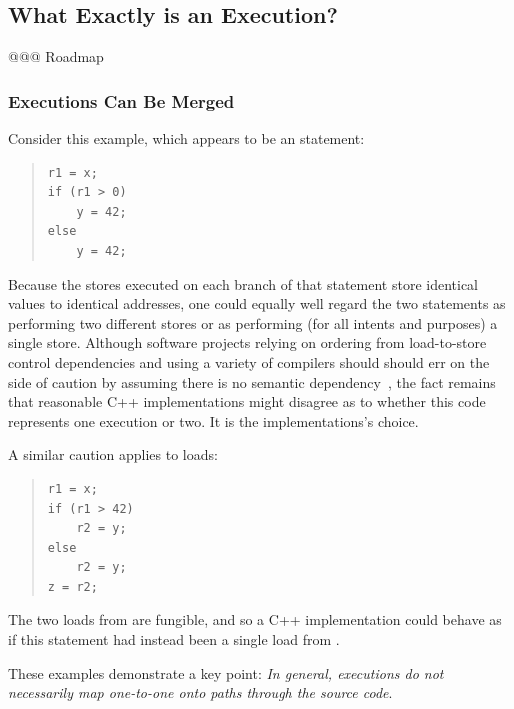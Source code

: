 \documentclass[10]{article}
\begin{document}
\subsection{What Exactly is an Execution?}
\label{sec:What Exactly is an Execution?}

@@@ Roadmap

\subsubsection{Executions Can Be Merged}
\label{sec:Executions Can Be Merged}

Consider this example, which appears to be an  statement:

\begin{quote}
\begin{verbatim}
r1 = x;
if (r1 > 0)
    y = 42;
else
    y = 42;
\end{verbatim}
\end{quote}

Because the stores executed on each branch of that  statement store
identical values to identical addresses, one could equally well regard
the two statements as performing two different stores or as performing
(for all intents and purposes) a single store.
Although software projects relying on ordering from load-to-store control
dependencies and using a variety of compilers should should err on the
side of caution by assuming there is no semantic
dependency~\cite{Howells2009membartxt},
the fact remains that reasonable C++ implementations might disagree as
to whether this code represents one execution or two.
It is the implementations's choice.

A similar caution applies to loads:

\begin{quote}
\begin{verbatim}
r1 = x;
if (r1 > 42)
    r2 = y;
else
    r2 = y;
z = r2;
\end{verbatim}
\end{quote}

The two loads from  are fungible, and so a C++ implementation
could behave as if this  statement had instead been a single load
from .

These examples demonstrate a key point: 
\emph{In general, executions do not necessarily map one-to-one onto
paths through the source code}.%
\end{document}
